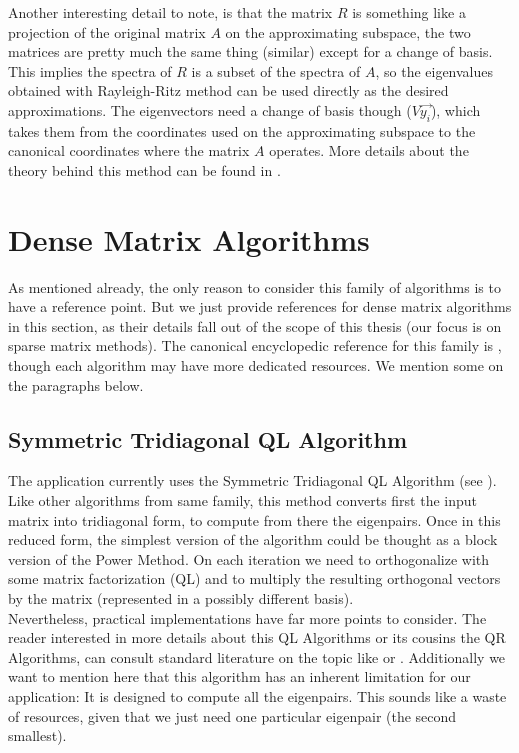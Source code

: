 Another interesting detail to note, is that the
matrix $R$ is something like a projection of the original matrix $A$
on the approximating subspace, the two matrices are pretty much the
same thing (similar) except for a change of 
basis. This implies the spectra of $R$ is a subset of the spectra of
$A$, so the eigenvalues obtained with Rayleigh-Ritz method can be used
directly as the desired approximations. The eigenvectors need a change
of basis though ($V\vec{y_i}$), which takes them from the coordinates
used on the approximating subspace to the canonical coordinates where
the matrix $A$ operates. More details about the theory behind this
method can be found in \cite{saad92}.

\section{Dense Matrix Algorithms}

As mentioned already, the only reason to consider this family of
algorithms is to have a reference point. But we just provide references for 
dense matrix algorithms in this section, as their details fall out of the scope of
this thesis (our focus is on sparse matrix methods). The canonical
encyclopedic reference for this family is \cite{golub13}, though each
algorithm may have more dedicated resources. We mention some on the
paragraphs below. \\

\subsection{Symmetric Tridiagonal QL Algorithm}
The application currently uses the Symmetric Tridiagonal QL
Algorithm (see \cite{parlett80}). Like other algorithms from same family, this method
converts first the input matrix into tridiagonal form, to
compute from there the eigenpairs. Once in this reduced form, the
simplest version of the algorithm could be thought as a block
version of the Power Method. On each iteration we need to
orthogonalize with some matrix factorization (QL) and to multiply the
resulting orthogonal vectors by the matrix (represented in a possibly
different basis). \\

Nevertheless, practical implementations have far
more points to consider. The reader interested in more details about
this QL Algorithms or its cousins the QR Algorithms, can consult
standard literature on the topic like \cite{golub13} or
\cite{parlett80}. Additionally we want to mention
here that this algorithm has an inherent limitation for our
application: It is designed to compute all the eigenpairs. This sounds
like a waste of resources, given that we just need one particular
eigenpair (the second smallest). 

